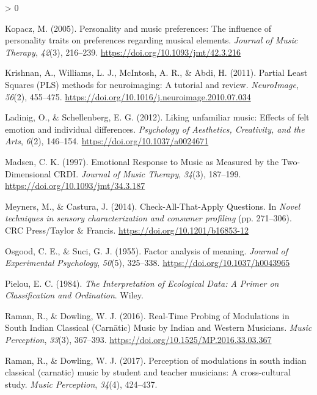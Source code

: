\documentclass[
  english,
  man,floatsintext]{apa6}
\newlength{\cslhangindent}
\newenvironment{CSLReferences}[2] %
 {%
  \setlength{\parindent}{0pt}
  \ifodd #1 \everypar{\setlength{\hangindent}{\cslhangindent}}\ignorespaces\fi
  \ifnum #2 > 0
  \setlength{\parskip}{#2\baselineskip}
  \fi
 }%
 {}
\begin{document}
\begin{CSLReferences}{1}{0}
\leavevmode\hypertarget{ref-Kopacz2005}{}%
Kopacz, M. (2005). {Personality and music preferences: The influence of personality traits on preferences regarding musical elements}. \emph{Journal of Music Therapy}, \emph{42}(3), 216--239. \url{https://doi.org/10.1093/jmt/42.3.216}

\leavevmode\hypertarget{ref-Krishnan2011}{}%
Krishnan, A., Williams, L. J., McIntosh, A. R., \& Abdi, H. (2011). {Partial Least Squares (PLS) methods for neuroimaging: A tutorial and review}. \emph{NeuroImage}, \emph{56}(2), 455--475. \url{https://doi.org/10.1016/j.neuroimage.2010.07.034}

\leavevmode\hypertarget{ref-Ladinig2012}{}%
Ladinig, O., \& Schellenberg, E. G. (2012). {Liking unfamiliar music: Effects of felt emotion and individual differences}. \emph{Psychology of Aesthetics, Creativity, and the Arts}, \emph{6}(2), 146--154. \url{https://doi.org/10.1037/a0024671}

\leavevmode\hypertarget{ref-Madsen1997}{}%
Madsen, C. K. (1997). {Emotional Response to Music as Measured by the Two-Dimensional CRDI}. \emph{Journal of Music Therapy}, \emph{34}(3), 187--199. \url{https://doi.org/10.1093/jmt/34.3.187}

\leavevmode\hypertarget{ref-Meyners2014}{}%
Meyners, M., \& Castura, J. (2014). {Check-All-That-Apply Questions}. In \emph{Novel techniques in sensory characterization and consumer profiling} (pp. 271--306). CRC Press/Taylor {\&} Francis. \url{https://doi.org/10.1201/b16853-12}

\leavevmode\hypertarget{ref-Osgood1955}{}%
Osgood, C. E., \& Suci, G. J. (1955). {Factor analysis of meaning}. \emph{Journal of Experimental Psychology}, \emph{50}(5), 325--338. \url{https://doi.org/10.1037/h0043965}

\leavevmode\hypertarget{ref-Pielou1984}{}%
Pielou, E. C. (1984). \emph{{The Interpretation of Ecological Data: A Primer on Classification and Ordination}}. Wiley.

\leavevmode\hypertarget{ref-Raman2016}{}%
Raman, R., \& Dowling, W. J. (2016). {Real-Time Probing of Modulations in South Indian Classical (Carnātic) Music by Indian and Western Musicians}. \emph{Music Perception}, \emph{33}(3), 367--393. \url{https://doi.org/10.1525/MP.2016.33.03.367}

\leavevmode\hypertarget{ref-Raman2017}{}%
Raman, R., \& Dowling, W. J. (2017). {Perception of modulations in south indian classical (carnatic) music by student and teacher musicians: A cross-cultural study}. \emph{Music Perception}, \emph{34}(4), 424--437.


\end{CSLReferences}
\end{document}

